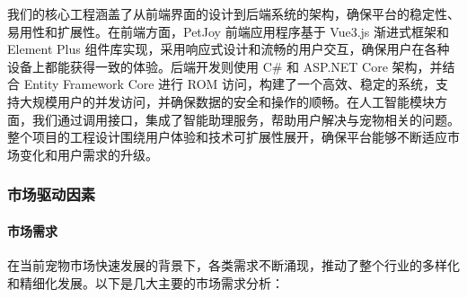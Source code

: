 我们的核心工程涵盖了从前端界面的设计到后端系统的架构，确保平台的稳定性、易用性和扩展性。在前端方面，PetJoy 前端应用程序基于 Vue3.js 渐进式框架和 Element Plus 组件库实现，采用响应式设计和流畅的用户交互，确保用户在各种设备上都能获得一致的体验。后端开发则使用 C\# 和 ASP.NET Core 架构，并结合 Entity Framework Core 进行 ROM 访问，构建了一个高效、稳定的系统，支持大规模用户的并发访问，并确保数据的安全和操作的顺畅。在人工智能模块方面，我们通过调用接口，集成了智能助理服务，帮助用户解决与宠物相关的问题。整个项目的工程设计围绕用户体验和技术可扩展性展开，确保平台能够不断适应市场变化和用户需求的升级。

\subsubsection{市场驱动因素}

\paragraph{市场需求}

在当前宠物市场快速发展的背景下，各类需求不断涌现，推动了整个行业的多样化和精细化发展。以下是几大主要的市场需求分析：

